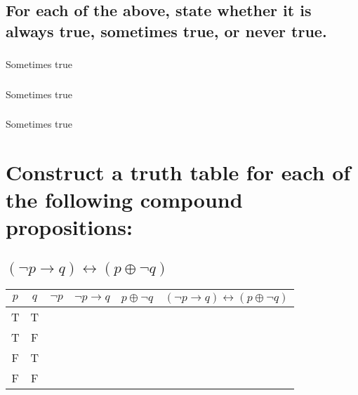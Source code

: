 \documentclass{article}
\begin{document}
    \subsection{For each of the above, state whether it is always true, sometimes true, or never true.} 
        \subsubsection{}Sometimes true
        \subsubsection{}Sometimes true
        \subsubsection{}Sometimes true

\section{Construct a truth table for each of the following compound propositions:}
    \subsection{\texorpdfstring{$(\neg p \to q) \leftrightarrow (p \oplus \neg q)$}{(¬p → q) ↔ (p ⊕ ¬q)}}
        \begin{center}
            \begin{tabular}{|c|c|c|c|c|c|}
                \hline
                $p$ & $q$ & $\neg p$ & $\neg p \to q$ & $p \oplus \neg q$ & $(\neg p \to q) \leftrightarrow (p \oplus \neg q)$ \\
                \hline
                T & T &   &   &   &   \\
                T & F &   &   &   &   \\
                F & T &   &   &   &   \\
                F & F &   &   &   &   \\
                \hline
            \end{tabular}
        \end{center}
\end{document}
